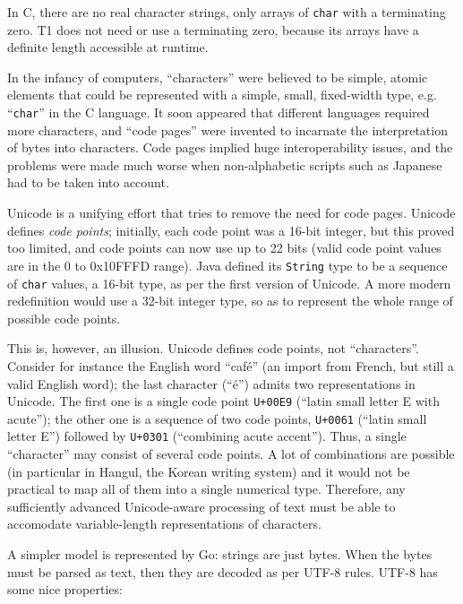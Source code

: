 \begin{rationale}
In C, there are no real character strings, only arrays of \verb|char|
with a terminating zero. T1 does not need or use a terminating zero,
because its arrays have a definite length accessible at runtime.

In the infancy of computers, ``characters'' were believed to be simple,
atomic elements that could be represented with a simple, small,
fixed-width type, e.g. ``\verb|char|'' in the C language. It soon
appeared that different languages required more characters, and ``code
pages'' were invented to incarnate the interpretation of bytes into
characters. Code pages implied huge interoperability issues, and the
problems were made much worse when non-alphabetic scripts such as
Japanese had to be taken into account.

Unicode is a unifying effort that tries to remove the need for code
pages. Unicode defines \emph{code points}; initially, each code point
was a 16-bit integer, but this proved too limited, and code points can
now use up to 22 bits (valid code point values are in the 0 to 0x10FFFD
range). Java defined its \verb|String| type to be a sequence of
\verb|char| values, a 16-bit type, as per the first version of Unicode.
A more modern redefinition would use a 32-bit integer type, so as to
represent the whole range of possible code points.

This is, however, an illusion. Unicode defines code points, not
``characters''. Consider for instance the English word ``café'' (an
import from French, but still a valid English word); the last character
(``é'') admits two representations in Unicode. The first one is a single
code point \verb|U+00E9| (``latin small letter E with acute''); the
other one is a sequence of two code points, \verb|U+0061| (``latin small
letter E'') followed by \verb|U+0301| (``combining acute accent'').
Thus, a single ``character'' may consist of several code points. A lot
of combinations are possible (in particular in Hangul, the Korean
writing system) and it would not be practical to map all of them into a
single numerical type. Therefore, any sufficiently advanced
Unicode-aware processing of text must be able to accomodate
variable-length representations of characters.

A simpler model is represented by Go: strings are just bytes. When the
bytes must be parsed as text, then they are decoded as per UTF-8 rules.
UTF-8 has some nice properties:
\begin{itemize}


\end{itemize}
\end{rationale}
